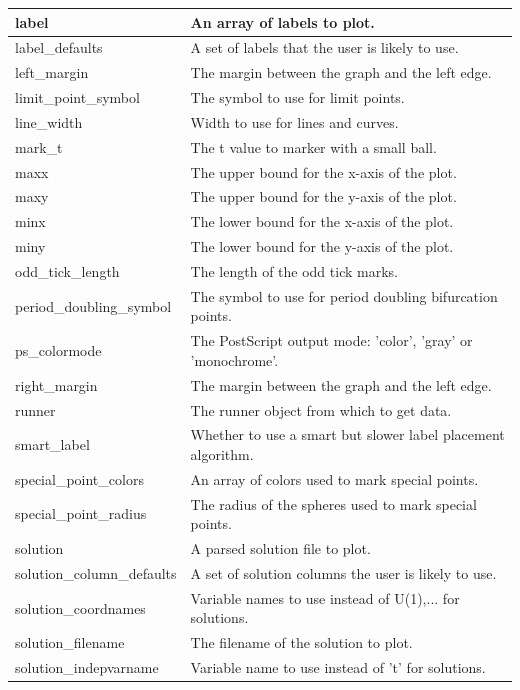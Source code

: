\documentclass[12pt]{report}
\begin{document}
\begin{longtable}{| l | l |}
 \hline
 label  & An array of labels to plot.\\
 \hline
 label\_defaults  & A set of labels that the user is likely to use. \\
 \hline
 left\_margin  & The margin between the graph and the left edge. \\
 \hline
 limit\_point\_symbol  &    The symbol to use for limit points. \\ 
 \hline
 line\_width & Width to use for lines and curves. \\
 \hline
 mark\_t  &  The t value to marker with a small ball. \\      
 \hline
 maxx  & The upper bound for the x-axis of the plot. \\
 \hline
 maxy  & The upper bound for the y-axis of the plot. \\
 \hline
 minx  &  The lower bound for the x-axis of the plot. \\
 \hline
 miny  & The lower bound for the y-axis of the plot. \\
 \hline
 odd\_tick\_length  & The length of the odd tick marks. \\
 \hline
 period\_doubling\_symbol  &   The symbol to use for period doubling bifurcation points. \\ 
 \hline
 ps\_colormode  & The PostScript output mode: 'color', 'gray' or 'monochrome'. \\ 
 \hline
 right\_margin  & The margin between the graph and the left edge. \\
 \hline
 runner  &  The runner object from which to get data. \\       
 \hline
 smart\_label  & Whether to use a smart but slower label placement algorithm. \\ 
 \hline
 special\_point\_colors  &    An array of colors used to mark special points. \\ 
 \hline
 special\_point\_radius  &    The radius of the spheres used to mark special points. \\ 
 \hline
 solution  &  A parsed solution file to plot. \\
 \hline
 solution\_column\_defaults  & A set of solution columns the user is likely to use.\\
 \hline
 solution\_coordnames & Variable names to use instead of U(1),... for solutions. \\
 \hline
 solution\_filename  & The filename of the solution to plot. \\
 \hline
 solution\_indepvarname & Variable name to use instead of 't' for solutions. \\

\end{longtable}
\end{document}
